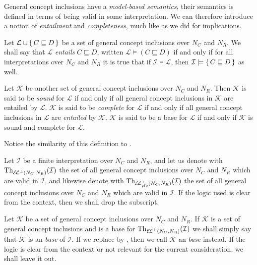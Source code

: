 General concept inclusions have a \emph{model-based semantics}, their semantics is defined
in terms of being valid in some interpretation.  We can therefore introduce a notion of
\emph{entailment} and \emph{completeness}, much like as we did for implications.

\begin{Definition}
  \label{def:entailment-of-gcis}
  Let $\mathcal{L} \cup {\ensuremath{\{\, C \sqsubseteq D \,\}}}$ be a set of general concept inclusions
  over $N_C$ and $N_R$.  We shall say that $\mathcal{L}$ \emph{entails} $C \sqsubseteq D$,
  written $\mathcal{L} \models (C \sqsubseteq D)$ if and only if for all interpretations
  over $N_C$ and $N_R$ it is true that if $\mathcal{I} \models \mathcal{L}$, then
  $\mathcal{I} \models {\ensuremath{\{\, C \sqsubseteq D \,\}}}$ as well.

  Let $\mathcal{K}$ be another set of general concept inclusions over $N_C$ and $N_R$.
  Then $\mathcal{K}$ is said to be \emph{sound} for $\mathcal{L}$ if and only if all
  general concept inclusions in $\mathcal{K}$ are entailed by $\mathcal{L}$.
  $\mathcal{K}$ is said to be \emph{complete} for $\mathcal{L}$ if and only if all general
  concept inclusions in $\mathcal{L}$ are \emph{entailed} by $\mathcal{K}$.  $\mathcal{K}$
  is said to be a base for $\mathcal{L}$ if and only if $\mathcal{K}$ is sound and
  complete for $\mathcal{L}$.
\end{Definition}

Notice the similarity of this definition to .

Let $\mathcal{I}$ be a finite interpretation over $N_C$ and $N_R$, and let us denote with
$\operatorname{Th}_{{{\mathcal{E}\kern-.3ex\mathcal{L}}^\bot}(N_C, N_R)}(\mathcal{I})$ the set of all \ELbot general concept inclusions
over $N_C$ and $N_R$ which are valid in $\mathcal{I}$, and likewise denote with
$\operatorname{Th}_{{{\mathcal{E}\kern-.3ex\mathcal{L}}_\text{gfp}^\bot}(N_C, N_R)}(\mathcal{I})$ the set of all \ELgfpbot general concept
inclusions over $N_C$ and $N_R$ which are valid in $\mathcal{I}$.  If the logic used is
clear from the context, then we shall drop the subscript.

Let $\mathcal{K}$ be a set of general concept inclusions over $N_C$ and $N_R$.  If
$\mathcal{K}$ is a set of \ELbot general concept inclusions and is a base for
$\operatorname{Th}_{{{\mathcal{E}\kern-.3ex\mathcal{L}}^\bot}(N_C, N_R)}(\mathcal{I})$ we shall simply say that $\mathcal{K}$ is an
\emph{\ELbot base} of $\mathcal{I}$.  If we replace \ELbot by \ELgfpbot, then we call
$\mathcal{K}$ an \emph{\ELgfpbot base} instead.  If the logic is clear from the context or
not relevant for the current consideration, we shall leave it out.

